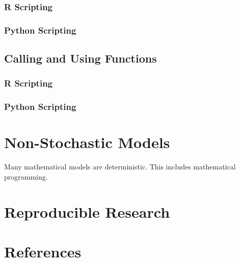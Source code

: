 \documentclass[]{book}
\theoremstyle{definition}
\theoremstyle{definition}
\theoremstyle{definition}
\theoremstyle{remark}
\begin{document}
\subsection{R Scripting}\label{r-scripting-12}

\subsection{Python Scripting}\label{python-scripting-12}

\section{Calling and Using
Functions}\label{calling-and-using-functions-2}

\subsection{R Scripting}\label{r-scripting-13}

\subsection{Python Scripting}\label{python-scripting-13}

\chapter{Non-Stochastic Models}\label{non-stochastic-models}

Many mathematical models are deterministic. This includes mathematical
programming.

\chapter{Reproducible Research}\label{reproducible-research}

\chapter{References}\label{references}
\end{document}
